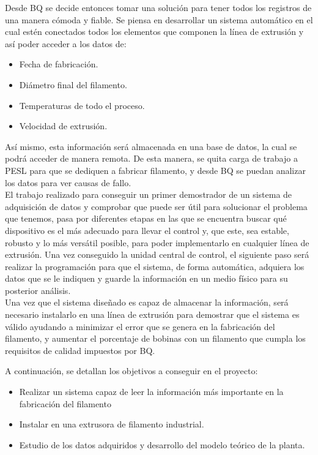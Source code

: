 Desde BQ se decide entonces tomar una solución para tener todos los registros de una manera cómoda y fiable. Se piensa en desarrollar un sistema automático en el cual estén conectados todos los elementos que componen la línea de extrusión y así poder acceder a los datos de:

\begin{itemize}
    \item{Fecha de fabricación.}
    \item{Diámetro final del filamento.}
    \item{Temperaturas de todo el proceso.}
    \item{Velocidad de extrusión.}
\end{itemize}

Así mismo, esta información será almacenada en una base de datos, la cual se podrá acceder de manera remota. De esta manera, se quita carga de trabajo a PESL para que se dediquen a fabricar filamento, y desde BQ se puedan analizar los datos para ver causas de fallo.\\

El trabajo realizado para conseguir un primer demostrador de un sistema de adquisición de datos y comprobar que puede ser útil para solucionar el problema que tenemos, pasa por diferentes etapas en las que se encuentra buscar qué dispositivo es el más adecuado para llevar el control y, que este, sea estable, robusto y lo más versátil posible, para poder implementarlo en cualquier línea de extrusión. Una vez conseguido la unidad central de control, el siguiente paso será realizar la programación para que el sistema, de forma automática, adquiera los datos que se le indiquen y guarde la información en un medio físico para su posterior análisis.\\

Una vez que el sistema diseñado es capaz de almacenar la información, será necesario instalarlo en una línea de extrusión para demostrar que el sistema es válido ayudando a minimizar el error que se genera en la fabricación del filamento, y aumentar el porcentaje de bobinas con un filamento que cumpla los requisitos de calidad impuestos por BQ.

A continuación, se detallan los objetivos a conseguir en el proyecto:

\begin{itemize}
    \item Realizar un sistema capaz de leer la información más importante en la fabricación del filamento
    \item Instalar en una extrusora de filamento industrial.
    \item Estudio de los datos adquiridos y desarrollo del modelo teórico de la planta.
\end{itemize}
\label{Listado_objetivos}

